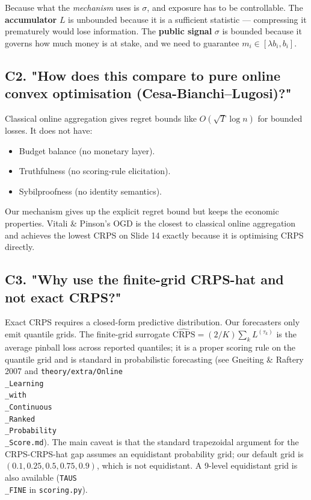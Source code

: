 \documentclass[11pt]{article}
\begin{document}
Because what the \emph{mechanism} uses is $\sigma$, and exposure has to be controllable. The \textbf{accumulator} $L$ is unbounded because it is a sufficient statistic --- compressing it prematurely would lose information. The \textbf{public signal} $\sigma$ is bounded because it governs how much money is at stake, and we need to guarantee $m_i \in [\lambda b_i, b_i]$.

\subsection{C2. "How does this compare to pure online convex optimisation (Cesa-Bianchi--Lugosi)?"}


Classical online aggregation gives regret bounds like $O(\sqrt T \log n)$ for bounded losses. It does not have:

\begin{itemize}
\item Budget balance (no monetary layer).
\item Truthfulness (no scoring-rule elicitation).
\item Sybilproofness (no identity semantics).
\end{itemize}

Our mechanism gives up the explicit regret bound but keeps the economic properties. Vitali \& Pinson's OGD is the closest to classical online aggregation and achieves the lowest CRPS on Slide 14 exactly because it is optimising CRPS directly.

\subsection{C3. "Why use the finite-grid CRPS-hat and not exact CRPS?"}


Exact CRPS requires a closed-form predictive distribution. Our forecasters only emit quantile grids. The finite-grid surrogate $\widehat{\text{CRPS}} = (2/K)\sum_k L^{(\tau_k)}$ is the average pinball loss across reported quantiles; it is a proper scoring rule on the quantile grid and is standard in probabilistic forecasting (see Gneiting \& Raftery 2007 and \texttt{theory/extra/Online\\_Learning\\_with\\_Continuous\\_Ranked\\_Probability\\_Score.md}). The main caveat is that the standard trapezoidal argument for the CRPS-CRPS-hat gap assumes an equidistant probability grid; our default grid is $(0.1, 0.25, 0.5, 0.75, 0.9)$, which is not equidistant. A 9-level equidistant grid is also available (\texttt{TAUS\\_FINE} in \texttt{scoring.py}).
\end{document}
